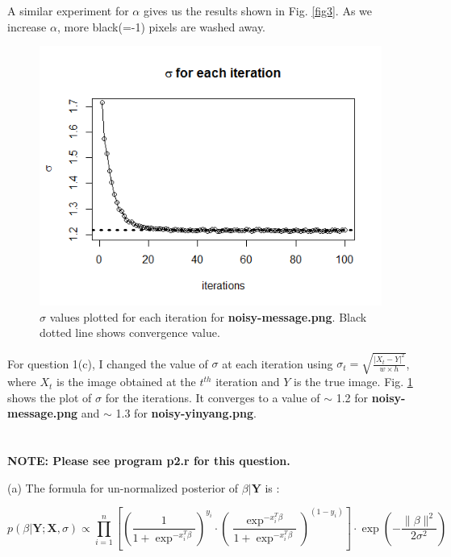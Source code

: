 \documentclass[11pt]{article}
\newcommand{\XB}{\mathbf{X}}
\newcommand{\YB}{\mathbf{Y}}
\begin{document}
\par A similar experiment for $\alpha$ gives us the results shown in Fig. \ref{fig3}. As we increase $\alpha$, more black(=-1) pixels are washed away. 
\vspace{-10pt}
\begin{figure}[!hbt]
\includegraphics[width=\linewidth]{sigma.png}
\vspace{-20pt}
\caption{$\sigma$ values plotted for each iteration for \textbf{noisy-message.png}. Black dotted line shows convergence value.}
\label{fig4}
\end{figure}
\vspace{-10pt}
\par For question 1(c), I changed the value of $\sigma$ at each iteration using $\sigma_{t} = \sqrt{\frac{|X_{t}-Y|^2}{w \times h}}$, where $X_{t}$ is the image obtained at the $t^{th}$ iteration and $Y$ is the true image. Fig. \ref{fig4} shows the plot of $\sigma$ for the iterations. It converges to a value of $\sim$ 1.2 for \textbf{noisy-message.png} and $\sim$ 1.3 for \textbf{noisy-yinyang.png}.%

\section{}
\label{2}
\textbf{\large{NOTE: Please see program p2.r for this question.}}

\par (a) The formula for un-normalized posterior of $\beta | \YB$ is :

\begin{equation}
   p(\beta| \YB; \XB, \sigma) \propto \prod_{i=1}^{n} [(\frac{1}{1+\exp^{-x_{i}^{T}\beta} })^{y_i} \cdot (\frac{\exp^{-x_{i}^{T}\beta} }{1+\exp^{-x_{i}^{T}\beta} })^{(1-y_i)} ] \cdot \exp{(- \frac{\| \beta \|^2}{2\sigma^2})}
\label{eq1}
\end{equation}
\end{document}
